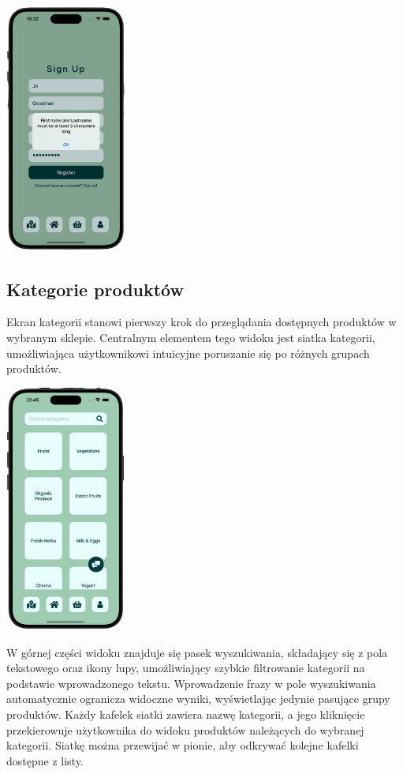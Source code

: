 \begin{center} 
    \includegraphics[width=0.3\textwidth]{images/front/register_invalid.png}
\end{center}

\subsection{Kategorie produktów}

Ekran kategorii stanowi pierwszy krok do przeglądania dostępnych produktów w wybranym sklepie. Centralnym elementem tego widoku jest siatka kategorii, umożliwiająca użytkownikowi intuicyjne poruszanie się po różnych grupach produktów. 

\begin{center} 
    \includegraphics[width=0.3\textwidth]{images/front/categories_page.png} 
\end{center}

W górnej części widoku znajduje się pasek wyszukiwania, składający się z pola tekstowego oraz ikony lupy, umożliwiający szybkie filtrowanie kategorii na podstawie wprowadzonego tekstu. Wprowadzenie frazy w pole wyszukiwania automatycznie ogranicza widoczne wyniki, wyświetlając jedynie pasujące grupy produktów. Każdy kafelek siatki zawiera nazwę kategorii, a jego kliknięcie przekierowuje użytkownika do widoku produktów należących do wybranej kategorii. Siatkę można przewijać w pionie, aby odkrywać kolejne kafelki dostępne z listy. 

